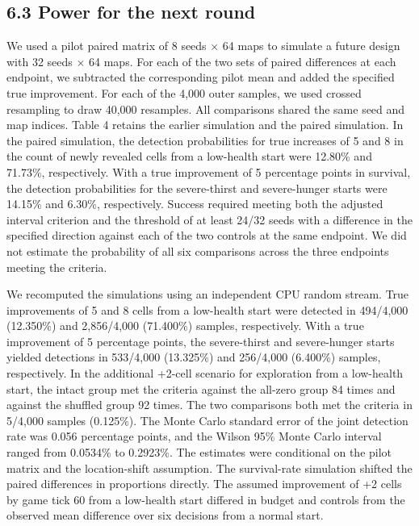 \documentclass{article}
\begin{document}
\subsection*{6.3 Power for the next round}


We used a pilot paired matrix of 8 seeds \ensuremath{\times} 64 maps to simulate a future design with 32 seeds \ensuremath{\times} 64 maps. For each of the two sets of paired differences at each endpoint, we subtracted the corresponding pilot mean and added the specified true improvement. For each of the 4,000 outer samples, we used crossed resampling to draw 40,000 resamples. All comparisons shared the same seed and map indices. Table 4 retains the earlier simulation and the paired simulation. In the paired simulation, the detection probabilities for true increases of 5 and 8 in the count of newly revealed cells from a low-health start were 12.80\% and 71.73\%, respectively. With a true improvement of 5 percentage points in survival, the detection probabilities for the severe-thirst and severe-hunger starts were 14.15\% and 6.30\%, respectively. Success required meeting both the adjusted interval criterion and the threshold of at least 24/32 seeds with a difference in the specified direction against each of the two controls at the same endpoint. We did not estimate the probability of all six comparisons across the three endpoints meeting the criteria.


We recomputed the simulations using an independent CPU random stream. True improvements of 5 and 8 cells from a low-health start were detected in 494/4,000 (12.350\%) and 2,856/4,000 (71.400\%) samples, respectively. With a true improvement of 5 percentage points, the severe-thirst and severe-hunger starts yielded detections in 533/4,000 (13.325\%) and 256/4,000 (6.400\%) samples, respectively. In the additional +2-cell scenario for exploration from a low-health start, the intact group met the criteria against the all-zero group 84 times and against the shuffled group 92 times. The two comparisons both met the criteria in 5/4,000 samples (0.125\%). The Monte Carlo standard error of the joint detection rate was 0.056 percentage points, and the Wilson 95\% Monte Carlo interval ranged from 0.0534\% to 0.2923\%. The estimates were conditional on the pilot matrix and the location-shift assumption. The survival-rate simulation shifted the paired differences in proportions directly. The assumed improvement of +2 cells by game tick 60 from a low-health start differed in budget and controls from the observed mean difference over six decisions from a normal start.
\end{document}
